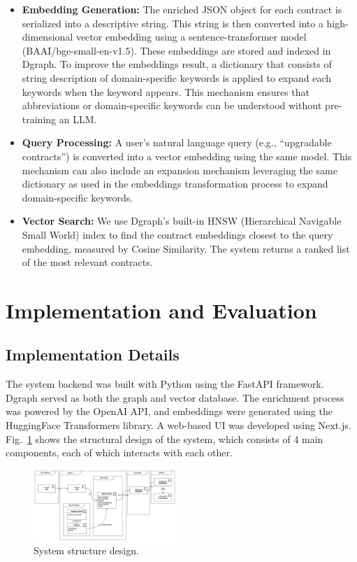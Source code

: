 \begin{itemize}
	\item \textbf{Embedding Generation:} The enriched JSON object for each contract is serialized into a descriptive string. This string is then converted into a high-dimensional vector embedding using a sentence-transformer model (BAAI/bge-small-en-v1.5). These embeddings are stored and indexed in Dgraph. To improve the embeddings result, a dictionary that consists of string description of domain-specific keywords is applied to expand each keywords when the keyword appears. This mechanism ensures that abbreviations or domain-specific keywords can be understood without pre-training an LLM.
	\item \textbf{Query Processing:} A user's natural language query (e.g., ``upgradable contracts'') is converted into a vector embedding using the same model. This mechanism can also include an expansion mechanism leveraging the same dictionary as used in the embeddings transformation process to expand domain-specific keywords.
	\item \textbf{Vector Search:} We use Dgraph's built-in HNSW (Hierarchical Navigable Small World) index to find the contract embeddings closest to the query embedding, measured by Cosine Similarity. The system returns a ranked list of the most relevant contracts.
\end{itemize}

\section{Implementation and Evaluation}\label{sec:implementation}

\subsection{Implementation Details}
The system backend was built with Python using the FastAPI framework. Dgraph served as both the graph and vector database. The enrichment process was powered by the OpenAI API, and embeddings were generated using the HuggingFace Transformers library. A web-based UI was developed using Next.js. Fig.~\ref{fig:structure} shows the structural design of the system, which consists of 4 main components, each of which interacts with each other.

\begin{figure}[htbp]
	\centerline{\includegraphics[width=0.48\textwidth]{resources/chapter-3/struktural-eng.png}}
	\caption{System structure design.}\label{fig:structure}
\end{figure}

